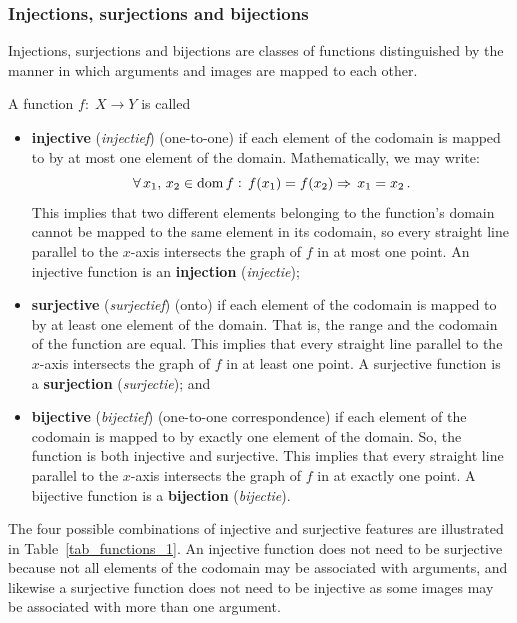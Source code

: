\subsubsection{Injections, surjections and bijections}
Injections, surjections and bijections are classes of functions distinguished by the manner in which arguments  and images are mapped to each other. 

\begin{definition}\label{injsurjbij}
A function $ f:\;X\to Y$ is called 
\vspace{-0.3cm}
\begin{itemize}
\item \textbf{injective} (\textit{injectief}) (one-to-one) if each element of the codomain is mapped to by at most one element of the domain. Mathematically, we may write:
$$
\forall\,x_1,\,x_2\in\text{dom}{\,}f:\,f(x_1)=f(x_2)\Rightarrow\,x_1=x_2\,.
$$
This implies that two different elements belonging to the function's domain cannot be mapped to the same element in its codomain, so every straight line parallel to the $x$-axis intersects the graph of $f$ in at most one point. An injective function is an \textbf{injection} (\textit{injectie});
\item \textbf{surjective} (\textit{surjectief}) (onto) if each element of the codomain is mapped to by at least one element of the domain. That is, the range and the codomain of the function are equal. This implies that every straight line parallel to the $x$-axis intersects the graph of $f$ in at least one point. A surjective function is a \textbf{surjection} (\textit{surjectie}); and
\item \textbf{bijective} (\textit{bijectief}) (one-to-one correspondence) if each element of the codomain is mapped to by exactly one element of the domain. So, the function is both injective and surjective. This implies that every straight line parallel to the $x$-axis intersects the graph of $f$ in at exactly one point. A bijective function is a \textbf{bijection} (\textit{bijectie}).
\end{itemize}
\end{definition}
The four possible combinations of injective and surjective features are illustrated in Table~\ref{tab_functions_1}.
An injective function does not need to be surjective  because not all elements of the codomain may be associated with arguments, and likewise a surjective function does not need to be injective as some images may be associated with more than one argument. 

